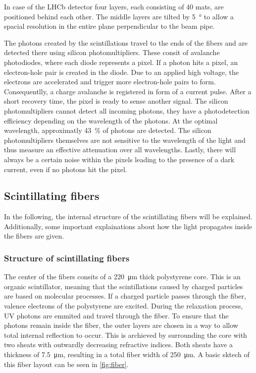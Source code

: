 In case of the LHCb detector four layers, each consisting of 40 mats, are positioned behind each other. The middle layers are tilted by \qty{5}{\degree}
to allow a spacial resolution in the entire plane perpendicular to the beam pipe.

The photons created by the scintillations travel to the ends of the fibers and are detected there using silicon photomultipliers.
These consit of avalanche photodiodes, where each diode represents a pixel. If a photon hits a pixel, an electron-hole pair is created
in the diode. Due to an applied high voltage, the electrons are accelerated and trigger more electron-hole pairs to form.
Consequentlly, a charge avalanche is registered in form of a current pulse. After a short recovery time, the pixel is ready to sense another signal.
The silicon photomultipliers cannot detect all incoming photons, they have a photodetection efficiency depending on the wavelength of
the photons. At the optimal wavelength, approximatly \qty{43}{\percent} of photons are detected. The silicon photomultipliers themselves
are not sensitive to the wavelength of the light and thus measure an effective attenuation over all wavelengths. Lastly, there will
always be a certain noise within the pixels leading to the presence of a dark current, even if no photons hit the pixel.

\subsection{Scintillating fibers}

In the following, the internal structure of the scintillating fibers will be explained. Additionally, some important
explainations about how the light propagates inside the fibers are given.

\subsubsection{Structure of scintillating fibers}

The center of the fibers consits of a \qty{220}{\micro\meter} thick polystyrene core. This is an organic scintillator,
meaning that the scintillations caused by charged particles are based on molecular processes. If a charged particle
passes through the fiber, valence electrons of the polystyrene are excited. During the relaxation process, UV photons
are emmited and travel through the fiber. To ensure that the photons remain inside the fiber, the outer layers are chosen
in a way to allow total internal reflection to occur. This is archieved by surrounding the core with two sheats with
outwardly decreasing refractive indices. Both sheats have a thickness of \qty{7.5}{\micro\meter}, resulting in a total fiber width
of \qty{250}{\micro\meter}. A basic sktech of this fiber layout can be seen in \autoref{fig:fiber}.

